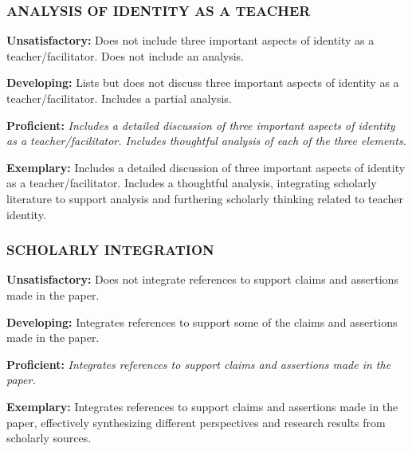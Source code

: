 \documentclass[
]{book}
\begin{document}
\hypertarget{analysis-of-identity-as-a-teacher}{%
\subsubsection*{ANALYSIS OF IDENTITY AS A TEACHER}\label{analysis-of-identity-as-a-teacher}}

\textbf{Unsatisfactory:} Does not include three important aspects of identity as a teacher/facilitator. Does not include an analysis.

\textbf{Developing:} Lists but does not discuss three important aspects of identity as a teacher/facilitator. Includes a partial analysis.

\textbf{Proficient:} \emph{Includes a detailed discussion of three important aspects of identity as a teacher/facilitator. Includes thoughtful analysis of each of the three elements.}

\textbf{Exemplary:} Includes a detailed discussion of three important aspects of identity as a teacher/facilitator. Includes a thoughtful analysis, integrating scholarly literature to support analysis and furthering scholarly thinking related to teacher identity.

\hypertarget{scholarly-integration}{%
\subsubsection*{SCHOLARLY INTEGRATION}\label{scholarly-integration}}

\textbf{Unsatisfactory:} Does not integrate references to support claims and assertions made in the paper.

\textbf{Developing:} Integrates references to support some of the claims and assertions made in the paper.

\textbf{Proficient:} \emph{Integrates references to support claims and assertions made in the paper.}

\textbf{Exemplary:} Integrates references to support claims and assertions made in the paper, effectively synthesizing different perspectives and research results from scholarly sources.
\end{document}
